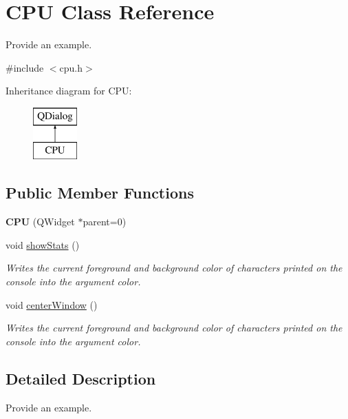 \hypertarget{class_c_p_u}{\section{C\+P\+U Class Reference}
\label{class_c_p_u}
}


Provide an example.  




{\ttfamily \#include $<$cpu.\+h$>$}

Inheritance diagram for C\+P\+U\+:\begin{figure}[H]
\begin{center}
\leavevmode
\includegraphics[height=2.000000cm]{class_c_p_u}
\end{center}
\end{figure}
\subsection*{Public Member Functions}
\begin{DoxyCompactItemize}
\item 
\hypertarget{class_c_p_u_a0155e9e9f7630a4114fbbfeb838c8e3f}{{\bfseries C\+P\+U} (Q\+Widget $\ast$parent=0)}\label{class_c_p_u_a0155e9e9f7630a4114fbbfeb838c8e3f}

\item 
void \hyperlink{class_c_p_u_ab03a06a70c34615649ed552a6bfbf9a6}{show\+Stats} ()
\begin{DoxyCompactList}\small\item\em Writes the current foreground and background color of characters printed on the console into the argument color. \end{DoxyCompactList}\item 
void \hyperlink{class_c_p_u_acd00910bff01f1314fc2cedd6cd61056}{center\+Window} ()
\begin{DoxyCompactList}\small\item\em Writes the current foreground and background color of characters printed on the console into the argument color. \end{DoxyCompactList}\end{DoxyCompactItemize}


\subsection{Detailed Description}
Provide an example. 

